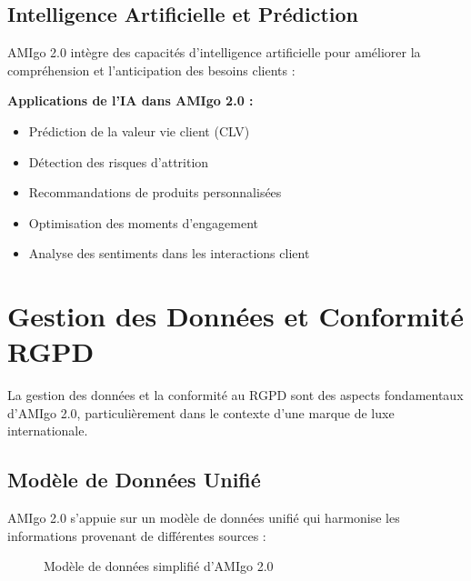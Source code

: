 \subsection{Intelligence Artificielle et Prédiction}

AMIgo 2.0 intègre des capacités d'intelligence artificielle pour améliorer la compréhension et l'anticipation des besoins clients :

\begin{mdframed}[backgroundcolor=notegreen, linewidth=0pt, innerleftmargin=10pt, innerrightmargin=10pt]
\textbf{Applications de l'IA dans AMIgo 2.0 :}
\begin{itemize}
    \item Prédiction de la valeur vie client (CLV)
    \item Détection des risques d'attrition
    \item Recommandations de produits personnalisées
    \item Optimisation des moments d'engagement
    \item Analyse des sentiments dans les interactions client
\end{itemize}
\end{mdframed}

\section{Gestion des Données et Conformité RGPD}

La gestion des données et la conformité au RGPD sont des aspects fondamentaux d'AMIgo 2.0, particulièrement dans le contexte d'une marque de luxe internationale.

\subsection{Modèle de Données Unifié}

AMIgo 2.0 s'appuie sur un modèle de données unifié qui harmonise les informations provenant de différentes sources :

\begin{figure}[H]
\centering
{}
\caption{Modèle de données simplifié d'AMIgo 2.0}
\label{fig:datamodel}
\end{figure}

